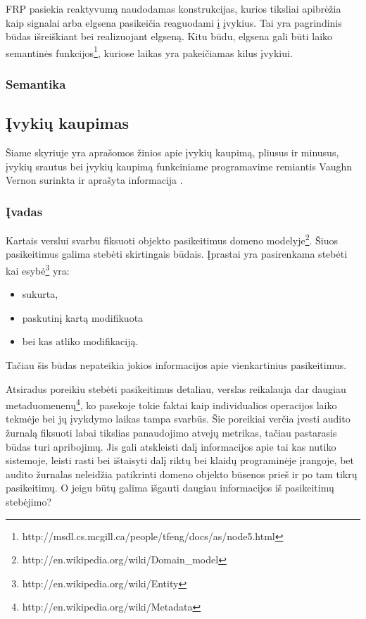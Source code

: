 FRP pasiekia reaktyvumą naudodamas konstrukcijas, kurios tiksliai apibrėžia kaip signalai arba elgsena pasikeičia reaguodami į įvykius. Tai yra pagrindinis būdas išreiškiant bei realizuojant elgseną. Kitu būdu, elgsena gali būti laiko semantinės funkcijos\footnote{http://msdl.cs.mcgill.ca/people/tfeng/docs/as/node5.html}, kuriose laikas yra pakeičiamas kilus įvykiui.

\subsubsection{Semantika}

\subsection{Įvykių kaupimas}

Šiame skyriuje yra aprašomos žinios apie įvykių kaupimą, pliusus ir minusus, įvykių srautus bei įvykių kaupimą funkciniame programavime remiantis Vaughn Vernon surinkta ir aprašyta informacija \cite{vernon2013implementing}.

\subsubsection{Įvadas}

Kartais verslui svarbu fiksuoti objekto pasikeitimus domeno modelyje\footnote{http://en.wikipedia.org/wiki/Domain\_model}. Šiuos pasikeitimus galima stebėti skirtingais būdais. Įprastai yra pasirenkama stebėti kai esybė\footnote{http://en.wikipedia.org/wiki/Entity} yra:

\begin{itemize}

	\item sukurta,

	\item paskutinį kartą modifikuota

	\item bei kas atliko modifikaciją.

\end{itemize}

Tačiau šis būdas nepateikia jokios informacijos apie vienkartinius pasikeitimus.

Atsiradus poreikiu stebėti pasikeitimus detaliau, verslas reikalauja dar daugiau metaduomenenų\footnote{http://en.wikipedia.org/wiki/Metadata}, ko pasekoje tokie faktai kaip individualios operacijos laiko tekmėje bei jų įvykdymo laikas tampa svarbūs. Šie poreikiai verčia įvesti audito žurnalą fiksuoti labai tikslias panaudojimo atvejų metrikas, tačiau pastarasis būdas turi apribojimų. Jis gali atskleisti dalį informacijos apie tai kas nutiko sistemoje, leisti rasti bei ištaisyti dalį riktų bei klaidų programinėje įrangoje, bet audito žurnalas neleidžia patikrinti domeno objekto būsenos prieš ir po tam tikrų pasikeitimų. O jeigu būtų galima išgauti daugiau informacijos iš pasikeitimų stebėjimo?

